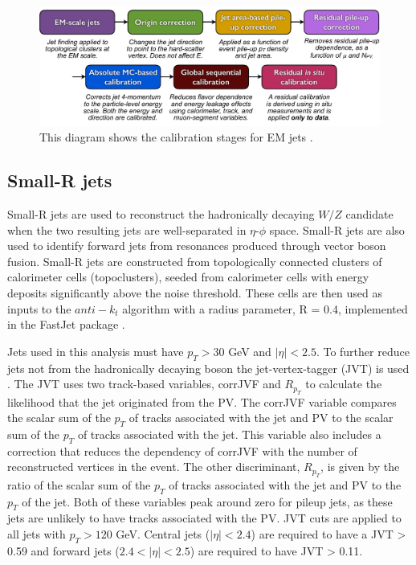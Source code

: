 \begin{figure}[h!]
  \centering
  \includegraphics[width=\hsize]{figures/Analysis/jetcalib.pdf}
  \caption{This diagram shows the calibration stages for EM jets \cite{jetcalib} .} 
  \label{fig:jetcalib}
\end{figure} 
\FloatBarrier

\subsection{Small-R jets}
Small-R jets are used to reconstruct the hadronically decaying $W/Z$ candidate when the two resulting jets are well-separated in $\eta$-$\phi$ space. Small-R jets are also used to identify forward jets from resonances produced through vector boson fusion. Small-R jets are constructed from topologically connected clusters of calorimeter cells (topoclusters), seeded from calorimeter cells with energy deposits significantly above the noise threshold.  These cells are then used as inputs to the $anti-k_{t}$ algorithm \cite{antikt} with a radius parameter, R = 0.4, implemented in the FastJet package \cite{fastjet}. 

Jets used in this analysis must have $p_{T} > 30$ GeV and $|\eta| < 2.5$. To further reduce jets not from the hadronically decaying boson the jet-vertex-tagger (JVT) is used \cite{jvt}. The JVT uses two track-based variables, corrJVF and $R_{p_{T}}$ to calculate the likelihood that the jet originated from the PV. The corrJVF variable compares the scalar sum of the $p_{T}$ of tracks associated with the jet and PV to the scalar sum of the $p_{T}$ of tracks associated with the jet. This variable also includes a correction that reduces the dependency of corrJVF with the number of reconstructed vertices in the event. The other discriminant, $R_{p_{T}}$, is given by the ratio of the scalar sum of the $p_{T}$ of tracks associated with the jet and PV to the $p_{T}$ of the jet. Both of these variables peak around zero for pileup jets, as these jets are unlikely to have tracks associated with the PV. JVT cuts are applied to all jets with $p_{T} > 120$ GeV. Central jets ($|\eta| < 2.4$) are required to have a JVT > 0.59 and forward jets ($2.4<|\eta| < 2.5$) are required to have JVT > 0.11. 


